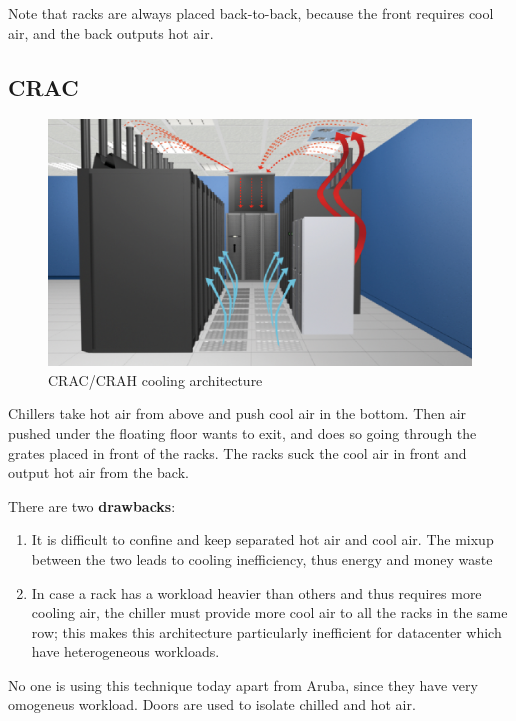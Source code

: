 Note that racks are always placed back-to-back, because the front requires cool air, and the back outputs hot air.
\subsection{CRAC}
\begin{figure}[htbp]
   \centering
   \includegraphics{images/CRAC.jpg}
   \caption{CRAC/CRAH cooling architecture}
   \label{fig:CRAC}
\end{figure}
Chillers take hot air from above and push cool air in the bottom. Then air pushed under the floating floor wants to exit, and does so going through the grates placed in front of the racks.
The racks suck the cool air in front and output hot air from the back.

{
   There are two \textbf{drawbacks}:
   \ns
\begin{enumerate}
   \item It is difficult to confine and keep separated hot air and cool air. The mixup between the two leads to cooling inefficiency, thus energy and money waste
   \item In case a rack has a workload heavier than others and thus requires more cooling air, the chiller must provide more cool air to all the racks in the same row;
   this makes this architecture particularly inefficient for datacenter which have heterogeneous workloads.
\end{enumerate}
}

No one is using this technique today apart from Aruba, since they have very omogeneus workload. Doors are used to isolate chilled and hot air.

\newpage
